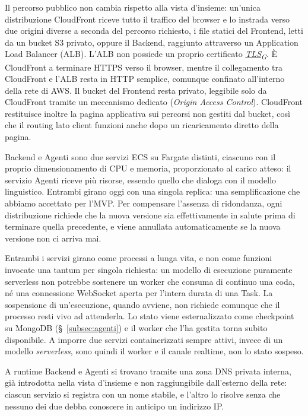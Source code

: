 \documentclass[12pt, a4paper]{article}
\newcommand{\urlglossario}{https://skynetunigroup.github.io/Code_Guardian/Documentazione/PB/glossario_v2.0.0.pdf}
\newcommand{\glo}[2]{\href{\urlglossario\#nameddest=#2}{#1\textsubscript{G}}}
\begin{document}
Il percorso pubblico non cambia rispetto alla vista d'insieme: un'unica distribuzione CloudFront riceve tutto il traffico del browser e lo instrada verso due origini diverse a seconda del percorso richiesto, i file statici del Frontend, letti da un bucket S3 privato, oppure il Backend, raggiunto attraverso un Application Load Balancer (ALB). L'ALB non possiede un proprio certificato \textit{\glo{TLS}{tls}}. È CloudFront a terminare HTTPS verso il browser, mentre il collegamento tra CloudFront e l'ALB resta in HTTP semplice, comunque confinato all'interno della rete di AWS. Il bucket del Frontend resta privato, leggibile solo da CloudFront tramite un meccanismo dedicato (\textit{Origin Access Control}). CloudFront restituisce inoltre la pagina applicativa sui percorsi non gestiti dal bucket, così che il routing lato client funzioni anche dopo un ricaricamento diretto della pagina.

Backend e Agenti sono due servizi ECS su Fargate distinti, ciascuno con il proprio dimensionamento di CPU e memoria, proporzionato al carico atteso: il servizio Agenti riceve più risorse, essendo quello che dialoga con il modello linguistico. Entrambi girano oggi con una singola replica: una semplificazione che abbiamo accettato per l'MVP. Per compensare l'assenza di ridondanza, ogni distribuzione richiede che la nuova versione sia effettivamente in salute prima di terminare quella precedente, e viene annullata automaticamente se la nuova versione non ci arriva mai.

Entrambi i servizi girano come processi a lunga vita, e non come funzioni invocate una tantum per singola richiesta: un modello di esecuzione puramente serverless non potrebbe sostenere un worker che consuma di continuo una coda, né una connessione WebSocket aperta per l'intera durata di una Task. La sospensione di un'esecuzione, quando avviene, non richiede comunque che il processo resti vivo ad attenderla. Lo stato viene esternalizzato come checkpoint su MongoDB (\S~\ref{subsec:agenti}) e il worker che l'ha gestita torna subito disponibile. A imporre due servizi containerizzati sempre attivi, invece di un modello \textit{serverless}, sono quindi il worker e il canale realtime, non lo stato sospeso.

A runtime Backend e Agenti si trovano tramite una zona DNS privata interna, già introdotta nella vista d'insieme e non raggiungibile dall'esterno della rete: ciascun servizio si registra con un nome stabile, e l'altro lo risolve senza che nessuno dei due debba conoscere in anticipo un indirizzo IP.
\end{document}
